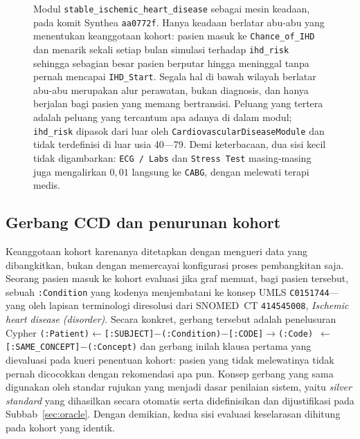 \begin{figure}[h]
\caption{Modul \texttt{stable\_ischemic\_heart\_disease} sebagai mesin keadaan, pada komit
Synthea \texttt{aa0772f}. Hanya keadaan berlatar abu-abu yang menentukan keanggotaan kohort:
pasien masuk ke \texttt{Chance\_of\_IHD} dan menarik sekali setiap bulan simulasi terhadap
\texttt{ihd\_risk} sehingga sebagian besar pasien berputar hingga meninggal tanpa pernah
mencapai \texttt{IHD\_Start}. Segala hal di bawah wilayah berlatar abu-abu merupakan alur
perawatan, bukan diagnosis, dan hanya berjalan bagi pasien yang memang bertransisi. Peluang
yang tertera adalah peluang yang tercantum apa adanya di dalam modul; \texttt{ihd\_risk}
dipasok dari luar oleh \texttt{CardiovascularDiseaseModule} dan tidak terdefinisi di luar usia
40---79. Demi keterbacaan, dua sisi kecil tidak digambarkan: \texttt{ECG / Labs} dan
\texttt{Stress Test} masing-masing juga mengalirkan $0{,}01$ langsung ke \texttt{CABG}, dengan
melewati terapi medis.}
\label{fig:sihd-module}
\end{figure}

\subsection{Gerbang CCD dan penurunan kohort}
\label{sec:gate}
Keanggotaan kohort karenanya ditetapkan dengan mengueri data yang dibangkitkan, bukan dengan
memercayai konfigurasi proses pembangkitan saja. Seorang pasien masuk ke kohort evaluasi jika graf
memuat, bagi pasien tersebut, sebuah \texttt{:Condition} yang kodenya menjembatani ke konsep
UMLS \texttt{C0151744}---yang oleh lapisan terminologi diresolusi dari SNOMED~CT
\texttt{414545008}, \emph{Ischemic heart disease (disorder)}. Secara konkret, gerbang tersebut
adalah penelusuran Cypher
\texttt{(:Patient)$\leftarrow$[:SUBJECT]$-$(:Condition)$-$[:CODE]$\rightarrow$(:Code)
$\leftarrow$[:SAME\_CONCEPT]$-$(:Concept)} dan gerbang inilah klausa pertama yang dievaluasi
pada kueri penentuan kohort: pasien yang tidak melewatinya tidak pernah dicocokkan dengan
rekomendasi apa pun. Konsep gerbang yang sama digunakan oleh standar rujukan yang menjadi dasar penilaian sistem,
yaitu \emph{silver standard} yang dihasilkan secara otomatis serta didefinisikan dan
dijustifikasi pada Subbab~\ref{sec:oracle}. Dengan demikian, kedua sisi evaluasi keselarasan
dihitung pada kohort yang identik.


